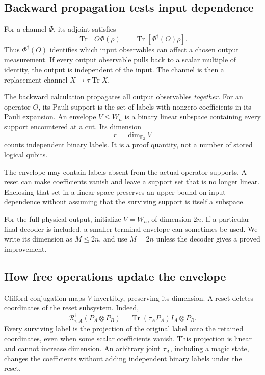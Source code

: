 \documentclass[11pt,a4paper]{article}
\numberwithin{equation}{section}
\theoremstyle{remark}\newtheorem*{remark}{Interpretation}
\newcommand{\Tr}{\operatorname{Tr}}
\newcommand{\F}{\mathbb F_2}
\newcommand{\R}{\mathcal R}
\begin{document}
\subsection{Backward propagation tests input dependence}
For a channel $\Phi$, its adjoint satisfies
\begin{equation}
\Tr[O\Phi(\rho)]=\Tr[\Phi^\dagger(O)\rho].
\end{equation}
Thus $\Phi^\dagger(O)$ identifies which input observables can affect a chosen output measurement. If every output observable pulls back to a scalar multiple of identity, the output is independent of the input. The channel is then a replacement channel $X\mapsto\tau\Tr X$.

The backward calculation propagates all output observables \emph{together}. For an operator $O$, its Pauli support is the set of labels with nonzero coefficients in its Pauli expansion. An envelope $V\le W_n$ is a binary linear subspace containing every support encountered at a cut. Its dimension
\begin{equation}
r=\dim_{\F}V
\end{equation}
counts independent binary labels. It is a proof quantity, not a number of stored logical qubits.

The envelope may contain labels absent from the actual operator supports. A reset can make coefficients vanish and leave a support set that is no longer linear. Enclosing that set in a linear space preserves an upper bound on input dependence without assuming that the surviving support is itself a subspace.

For the full physical output, initialize $V=W_n$, of dimension $2n$. If a particular final decoder is included, a smaller terminal envelope can sometimes be used. We write its dimension as $M\le2n$, and use $M=2n$ unless the decoder gives a proved improvement.

\subsection{How free operations update the envelope}
Clifford conjugation maps $V$ invertibly, preserving its dimension. A reset deletes coordinates of the reset subsystem. Indeed,
\begin{equation}
\R_{\tau,A}^{\dagger}(P_A\otimes P_B)
=\Tr(\tau_A P_A)I_A\otimes P_B.
\label{eq:reset-adjoint}
\end{equation}
Every surviving label is the projection of the original label onto the retained coordinates, even when some scalar coefficients vanish. This projection is linear and cannot increase dimension. An arbitrary joint $\tau_A$, including a magic state, changes the coefficients without adding independent binary labels under the reset.
\end{document}
